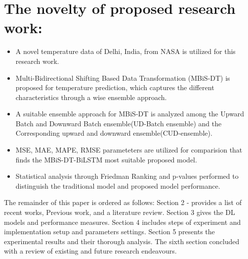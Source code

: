 \section*{The novelty of proposed research work:}

\begin{itemize}
\item A novel temperature data of Delhi, India, from NASA is utilized for this research work.
\item Multi-Bidirectional Shifting Based Data Transformation (MBiS-DT) is proposed for temperature prediction, which captures the different characteristics through a wise ensemble approach.
\item A suitable ensemble approach for MBiS-DT is analyzed among the Upward Batch and Downward Batch ensemble(UD-Batch ensemble) and the Corresponding upward and downward ensemble(CUD-ensemble).
\item MSE, MAE, MAPE, RMSE parameteters are utilized for comparision that finds the MBiS-DT-BiLSTM most suitable proposed model.
\item Statistical analysis through Friedman Ranking and p-values performed to distinguish the traditional model and proposed model performance.
\end{itemize}
The remainder of this paper is ordered as follows: Section 2 - provides a list of recent works, Previous work, and a literature review. Section 3 gives the DL models and performance measures. Section 4 includes steps of experiment and implementation setup and parameters settings. Section 5 presents the experimental results and their thorough analysis. The sixth section concluded with a review of existing and future research endeavours.
